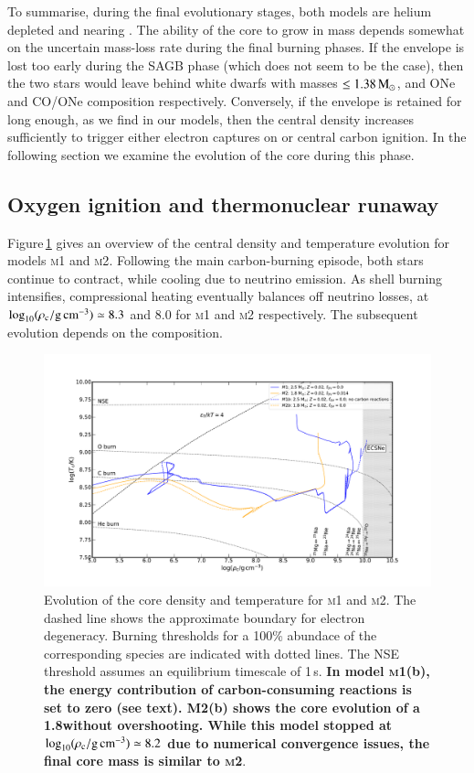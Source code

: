 \documentclass[twocolumn]{aa}
\begin{document}
To summarise, during the final evolutionary stages, both models are helium 
depleted and nearing \mch. The ability of the core 
to grow in mass depends somewhat on the uncertain mass-loss rate during the final burning phases. If the envelope 
is lost too early during the SAGB phase (which does not seem to be the case), then the two stars would 
leave behind white dwarfs with masses $\le 1.38\mathrm{\,M_\odot}$, and ONe and CO/ONe composition respectively. 
Conversely, if the envelope is retained for long enough, as we find in our models, then the central density increases sufficiently to trigger either electron captures on  or central carbon ignition. 
In the following section we examine the evolution of the core during this phase. 




\subsection{Oxygen ignition and thermonuclear runaway}\label{sec:runway}
Figure\,\ref{fig:2} gives an overview of the central density and temperature evolution for models  \textsc{m1} and \textsc{m2}.
Following the main carbon-burning episode, both stars continue to contract, while cooling  due to neutrino  emission. As shell 
burning intensifies, compressional heating eventually balances 
off neutrino losses, at $\log_{10} (\rho_{\mathrm{c}}/ \mathrm{g\,cm^{-3}}) \simeq 8.3$ and 8.0 for \textsc{m1} and \textsc{m2} respectively. The subsequent evolution depends on the composition. 
\begin{figure}[htb!]
\begin{center}
\includegraphics[width=1.0\textwidth]{Rhoc_vs_Tc.pdf}
\caption{Evolution of the core density and temperature for \textsc{m1} and \textsc{m2}. The dashed line shows the approximate boundary for electron degeneracy. Burning thresholds for a 100\% abundace of the corresponding species are indicated with dotted lines. The NSE threshold assumes an equilibrium timescale of 1\,s. {\bf In model \textsc{m1}(b), the energy contribution of carbon-consuming reactions is set to zero (see text). \textsc{M2}(b) shows the core evolution of a 1.8\msun without overshooting. While this model stopped at $\log_{10} (\rho_{\mathrm{c}}/ \mathrm{g\,cm^{-3}}) \simeq 8.2$ due to numerical convergence issues, the final core mass is similar to \textsc{m2}}.}
\label{fig:2}
\end{center}
\end{figure}
\end{document}
